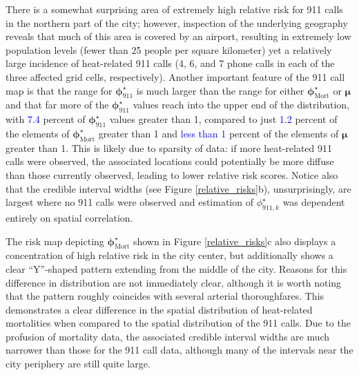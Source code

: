 \documentclass[final]{statsoc}
\begin{document}
There is a somewhat surprising area of extremely high relative risk for 911 calls in the northern part of the city; however, inspection of the underlying geography reveals that much of this area is covered by an airport, resulting in extremely low population levels (fewer than 25 people per square kilometer) yet a relatively large incidence of heat-related 911 calls (4, 6, and 7 phone calls in each of the three affected grid cells, respectively). Another important feature of the 911 call map is that the range for $\boldsymbol\phi^\star_{911}$ is much larger than the range for either $\boldsymbol\phi^\star_{\text{Mort}}$ or $\boldsymbol\mu$ and that far more of the $\boldsymbol\phi^\star_{911}$ values reach into the upper end of the distribution, with \textcolor{blue}{7.4} percent of $\boldsymbol\phi^\star_{911}$ values greater than 1, compared to just \textcolor{blue}{1.2} percent of the elements of $\boldsymbol\phi^\star_{\text{Mort}}$ greater than 1 and \textcolor{blue}{less than 1} percent of the elements of $\boldsymbol\mu$ greater than 1. This is likely due to sparsity of data: if more heat-related 911 calls were observed, the associated locations could potentially be more diffuse than those currently observed, leading to lower relative risk scores. Notice also that the credible interval widths (see Figure \ref{relative_risks}b), unsurprisingly, are largest where no 911 calls were observed and estimation of $\phi^\star_{911,k}$ was dependent entirely on spatial correlation. 

The risk map depicting $\boldsymbol\phi^\star_{\text{Mort}}$ shown in Figure \ref{relative_risks}c also displays a concentration of high relative risk in the city center, but additionally shows a clear ``Y''-shaped pattern extending from the middle of the city. Reasons for this difference in distribution are not immediately clear, although it is worth noting that the pattern roughly coincides with several arterial thoroughfares. This demonstrates a clear difference in the spatial distribution of heat-related mortalities when compared to the spatial distribution of the 911 calls. Due to the profusion of mortality data, the associated credible interval widths are much narrower than those for the 911 call data, although many of the intervals near the city periphery are still quite large.
\end{document}
